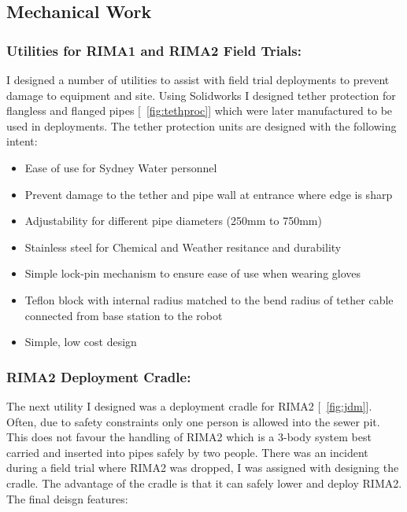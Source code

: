 \newpage
\subsection{Mechanical Work}

\subsubsection{Utilities for RIMA1 and RIMA2 Field Trials:}
I designed a number of utilities to assist with field trial deployments to prevent damage to equipment and site. Using Solidworks I designed
tether protection for flangless and flanged pipes [~\ref{fig:tethproc}] which were later manufactured to be used in deployments. The tether protection units are designed with the following intent:

\begin{itemize}
    \item Ease of use for Sydney Water personnel
    \item Prevent damage to the tether and pipe wall at entrance where edge is sharp
    \item Adjustability for different pipe diameters (250mm to 750mm)
    \item Stainless steel for Chemical and Weather resitance and durability
    \item Simple lock-pin mechanism to ensure ease of use when wearing gloves
    \item Teflon block with internal radius matched to the bend radius of tether cable connected from base station to the robot
    \item Simple, low cost design
\end{itemize}


\newpage
\subsubsection{RIMA2 Deployment Cradle:}
The next utility I designed was a deployment cradle for RIMA2 [~\ref{fig:jdm}]. Often, due to safety constraints only one person is allowed into the sewer pit. This does not favour the handling of RIMA2 which is a 3-body 
system best carried and inserted into pipes safely by two people. There was an incident during a field trial where RIMA2 was dropped, I was assigned with designing the cradle. The advantage 
of the cradle is that it can safely lower and deploy RIMA2. The final deisgn features:

